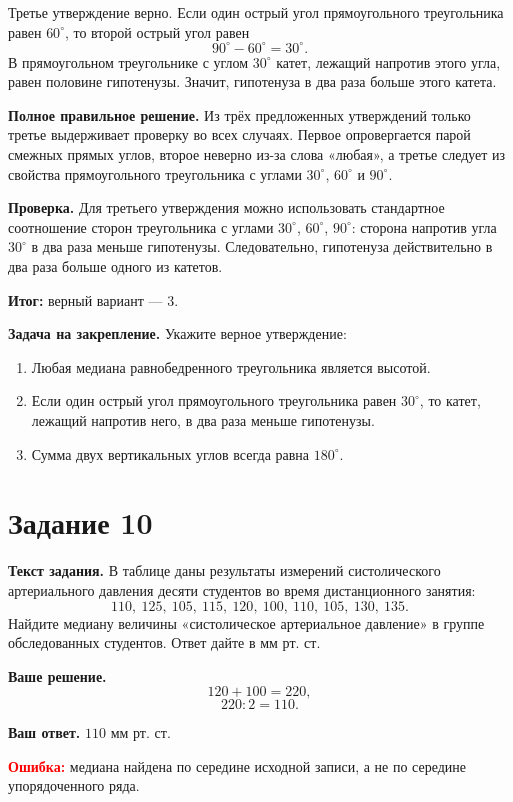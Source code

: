 \documentclass[12pt,a4paper]{article}
\begin{document}
Третье утверждение верно. Если один острый угол прямоугольного треугольника равен $60^\circ$, то второй острый угол равен
\[
90^\circ-60^\circ=30^\circ.
\]
В прямоугольном треугольнике с углом $30^\circ$ катет, лежащий напротив этого угла, равен половине гипотенузы. Значит, гипотенуза в два раза больше этого катета.

\textbf{Полное правильное решение.} Из трёх предложенных утверждений только третье выдерживает проверку во всех случаях. Первое опровергается парой смежных прямых углов, второе неверно из-за слова «любая», а третье следует из свойства прямоугольного треугольника с углами $30^\circ$, $60^\circ$ и $90^\circ$.

\textbf{Проверка.} Для третьего утверждения можно использовать стандартное соотношение сторон треугольника с углами $30^\circ$, $60^\circ$, $90^\circ$: сторона напротив угла $30^\circ$ в два раза меньше гипотенузы. Следовательно, гипотенуза действительно в два раза больше одного из катетов.

\textcolor{teal!60!black}{\textbf{Итог:}} верный вариант --- 3.

\textbf{Задача на закрепление.} Укажите верное утверждение:
\begin{enumerate}
  \item Любая медиана равнобедренного треугольника является высотой.
  \item Если один острый угол прямоугольного треугольника равен $30^\circ$, то катет, лежащий напротив него, в два раза меньше гипотенузы.
  \item Сумма двух вертикальных углов всегда равна $180^\circ$.
\end{enumerate}

\newpage
{}\label{task:10}
\section*{Задание 10}

\textbf{Текст задания.} В таблице даны результаты измерений систолического артериального давления десяти студентов во время дистанционного занятия:
\[
110,\ 125,\ 105,\ 115,\ 120,\ 100,\ 110,\ 105,\ 130,\ 135.
\]
Найдите медиану величины «систолическое артериальное давление» в группе обследованных студентов. Ответ дайте в мм рт. ст.

\textbf{Ваше решение.}
\[
120+100=220,
\]
\[
220:2=110.
\]

\textbf{Ваш ответ.} $110$ мм рт. ст.

\textcolor{red}{\textbf{Ошибка:}} медиана найдена по середине исходной записи, а не по середине упорядоченного ряда.
\end{document}
